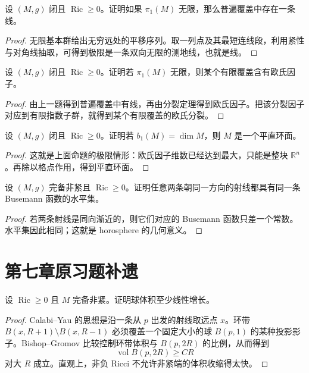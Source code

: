 \documentclass[11pt,a4paper,openany]{ctexbook}
\numberwithin{equation}{chapter}
\begin{document}
\begin{exercise}
设 \((M,g)\) 闭且 \(\operatorname{Ric}\ge 0\)。证明如果 \(\pi_1(M)\) 无限，那么普遍覆盖中存在一条线。
\end{exercise}
\begin{proof}
无限基本群给出无穷远处的平移序列。取一列点及其最短连线段，利用紧性与对角线抽取，可得到极限是一条双向无限的测地线，也就是线。
\end{proof}

\begin{exercise}
设 \((M,g)\) 闭且 \(\operatorname{Ric}\ge 0\)。证明若 \(\pi_1(M)\) 无限，则某个有限覆盖含有欧氏因子。
\end{exercise}
\begin{proof}
由上一题得到普遍覆盖中有线，再由分裂定理得到欧氏因子。把该分裂因子对应到有限指数子群，就得到某个有限覆盖的欧氏分裂。
\end{proof}

\begin{exercise}
设 \((M,g)\) 闭且 \(\operatorname{Ric}\ge 0\)。证明若 \(b_1(M)=\dim M\)，则 \(M\) 是一个平直环面。
\end{exercise}
\begin{proof}
这就是上面命题的极限情形：欧氏因子维数已经达到最大，只能是整块 \(\mathbb R^n\)。再除以格点作用，得到平直环面。
\end{proof}

\begin{exercise}
设 \((M,g)\) 完备非紧且 \(\operatorname{Ric}\ge 0\)。证明任意两条朝同一方向的射线都具有同一条 Busemann 函数的水平集。
\end{exercise}
\begin{proof}
若两条射线是同向渐近的，则它们对应的 Busemann 函数只差一个常数。水平集因此相同；这就是 horosphere 的几何意义。
\end{proof}
\section{第七章原习题补遗}

\begin{problem}
设 \(\operatorname{Ric}\ge0\) 且 \(M\) 完备非紧。证明球体积至少线性增长。
\end{problem}
\begin{proof}
Calabi--Yau 的思想是沿一条从 \(p\) 出发的射线取远点 \(x\)。环带 \(B(x,R+1)\setminus B(x,R-1)\) 必须覆盖一个固定大小的球 \(B(p,1)\) 的某种投影影子。Bishop--Gromov 比较控制环带体积与 \(B(p,2R)\) 的比例，从而得到
\[
\operatorname{vol}B(p,2R)\ge C R
\]
对大 \(R\) 成立。直观上，非负 Ricci 不允许非紧端的体积收缩得太快。
\end{proof}
\end{document}
